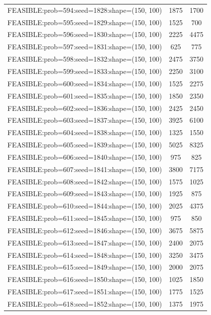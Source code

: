 \begin{longtable}{lcc}
FEASIBLE:prob=594:seed=1828:shape=(150, 100) &     1875 &  1700 \\
FEASIBLE:prob=595:seed=1829:shape=(150, 100) &     1525 &   700 \\
FEASIBLE:prob=596:seed=1830:shape=(150, 100) &     2225 &  4475 \\
FEASIBLE:prob=597:seed=1831:shape=(150, 100) &      625 &   775 \\
FEASIBLE:prob=598:seed=1832:shape=(150, 100) &     2475 &  3750 \\
FEASIBLE:prob=599:seed=1833:shape=(150, 100) &     2250 &  3100 \\
FEASIBLE:prob=600:seed=1834:shape=(150, 100) &     1525 &  2275 \\
FEASIBLE:prob=601:seed=1835:shape=(150, 100) &     1850 &  2350 \\
FEASIBLE:prob=602:seed=1836:shape=(150, 100) &     2425 &  2450 \\
FEASIBLE:prob=603:seed=1837:shape=(150, 100) &     3925 &  6100 \\
FEASIBLE:prob=604:seed=1838:shape=(150, 100) &     1325 &  1550 \\
FEASIBLE:prob=605:seed=1839:shape=(150, 100) &     5025 &  8325 \\
FEASIBLE:prob=606:seed=1840:shape=(150, 100) &      975 &   825 \\
FEASIBLE:prob=607:seed=1841:shape=(150, 100) &     3800 &  7175 \\
FEASIBLE:prob=608:seed=1842:shape=(150, 100) &     1575 &  1025 \\
FEASIBLE:prob=609:seed=1843:shape=(150, 100) &     1925 &   875 \\
FEASIBLE:prob=610:seed=1844:shape=(150, 100) &     2025 &  4375 \\
FEASIBLE:prob=611:seed=1845:shape=(150, 100) &      975 &   850 \\
FEASIBLE:prob=612:seed=1846:shape=(150, 100) &     3675 &  5875 \\
FEASIBLE:prob=613:seed=1847:shape=(150, 100) &     2400 &  2075 \\
FEASIBLE:prob=614:seed=1848:shape=(150, 100) &     3250 &  3475 \\
FEASIBLE:prob=615:seed=1849:shape=(150, 100) &     2000 &  2075 \\
FEASIBLE:prob=616:seed=1850:shape=(150, 100) &     1025 &  1850 \\
FEASIBLE:prob=617:seed=1851:shape=(150, 100) &     1775 &  1525 \\
FEASIBLE:prob=618:seed=1852:shape=(150, 100) &     1375 &  1975 \\

\end{longtable}
